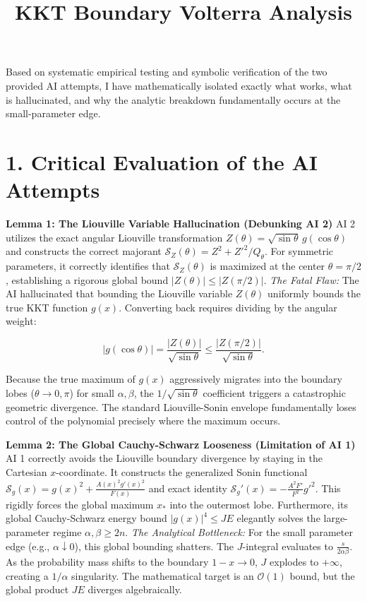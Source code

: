 \documentclass[11pt]{article}
\title{KKT Boundary Volterra Analysis}
\author{}
\date{}
\begin{document}
\maketitle
Based on systematic empirical testing and symbolic verification of the two provided AI attempts, I have mathematically isolated exactly what works, what is hallucinated, and why the analytic breakdown fundamentally occurs at the small-parameter edge.

\section*{1. Critical Evaluation of the AI Attempts}

\textbf{Lemma 1: The Liouville Variable Hallucination (Debunking AI 2)}
AI 2 utilizes the exact angular Liouville transformation \(Z(\theta) = \sqrt{\sin\theta} \, g(\cos\theta)\) and constructs the correct majorant \(\mathcal{S}_Z(\theta) = Z^2 + Z'^2/Q_\theta\). For symmetric parameters, it correctly identifies that \(\mathcal{S}_Z(\theta)\) is maximized at the center \(\theta = \pi/2\), establishing a rigorous global bound \(|Z(\theta)| \le |Z(\pi/2)|\).
\emph{The Fatal Flaw:} The AI hallucinated that bounding the Liouville variable \(Z(\theta)\) uniformly bounds the true KKT function \(g(x)\). Converting back requires dividing by the angular weight:

\begin{equation*}
|g(\cos\theta)| = \frac{|Z(\theta)|}{\sqrt{\sin\theta}} \le \frac{|Z(\pi/2)|}{\sqrt{\sin\theta}} .
\end{equation*}

Because the true maximum of \(g(x)\) aggressively migrates into the boundary lobes (\(\theta \to 0, \pi\)) for small \(\alpha, \beta\), the \(1/\sqrt{\sin\theta}\) coefficient triggers a catastrophic geometric divergence. The standard Liouville-Sonin envelope fundamentally loses control of the polynomial precisely where the maximum occurs.

\textbf{Lemma 2: The Global Cauchy-Schwarz Looseness (Limitation of AI 1)}
AI 1 correctly avoids the Liouville boundary divergence by staying in the Cartesian \(x\)-coordinate. It constructs the generalized Sonin functional \(\mathcal{S}_g(x) = g(x)^2 + \frac{A(x)^2 g'(x)^2}{F(x)}\) and exact identity \(\mathcal{S}_g'(x) = - \frac{A^2 F'}{F^2} g'^2\). This rigidly forces the global maximum \(x_*\) into the outermost lobe. Furthermore, its global Cauchy-Schwarz energy bound \(|g(x)|^4 \le J E\) elegantly solves the large-parameter regime \(\alpha, \beta \ge 2n\).
\emph{The Analytical Bottleneck:} For the small parameter edge (e.g., \(\alpha \downarrow 0\)), this global bounding shatters. The \(J\)-integral evaluates to \(\frac{s}{2\alpha\beta}\). As the probability mass shifts to the boundary \(1-x \to 0\), \(J\) explodes to \(+\infty\), creating a \(1/\alpha\) singularity. The mathematical target is an \(\mathcal{O}(1)\) bound, but the global product \(J E\) diverges algebraically.
\end{document}
